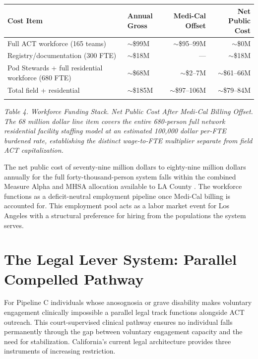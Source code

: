 \documentclass[12pt, letterpaper]{article}
\begin{document}
{\singlespacing
\begin{tabularx}{\textwidth}{@{}lXrr@{}}
\toprule
\rowcolor{rowgray}
Cost Item & Annual Gross & Medi-Cal Offset & Net Public Cost \\
\midrule
Full ACT workforce (165 teams) & $\sim$\$99M & $\sim$\$95--99M & $\sim$\$0M \\
\rowcolor{rowgray}
Registry/documentation (300 FTE) & $\sim$\$18M & --- & $\sim$\$18M \\
Pod Stewards + full residential workforce (680 FTE) & $\sim$\$68M & $\sim$\$2--7M & $\sim$\$61--66M \\
\midrule
Total field + residential & $\sim$\$185M & $\sim$\$97--106M & $\sim$\$79--84M \\
\addlinespace[4pt]
\bottomrule
\end{tabularx}\par
\vspace{8pt}
\noindent\textit{Table 4. Workforce Funding Stack. Net Public Cost After Medi-Cal Billing Offset. The 68 million dollar line item covers the entire 680-person full network residential facility staffing model at an estimated 100,000 dollar per-FTE burdened rate, establishing the distinct wage-to-FTE multiplier separate from field ACT capitalization.}
\par}
The net public cost of seventy-nine million dollars to eighty-nine million dollars annually for the full forty-thousand-person system falls within the combined Measure Alpha and MHSA allocation available to LA County \citep{lac_ceo_measure_a_2025}. The workforce functions as a deficit-neutral employment pipeline once Medi-Cal billing is accounted for. This employment pool acts as a labor market event for Los Angeles with a structural preference for hiring from the populations the system serves.

\clearpage
\section{The Legal Lever System: Parallel Compelled Pathway}

For Pipeline C individuals whose anosognosia or grave disability makes voluntary engagement clinically impossible a parallel legal track functions alongside ACT outreach. This court-supervised clinical pathway ensures no individual falls permanently through the gap between voluntary engagement capacity and the need for stabilization. California's current legal architecture provides three instruments of increasing restriction.
\end{document}
